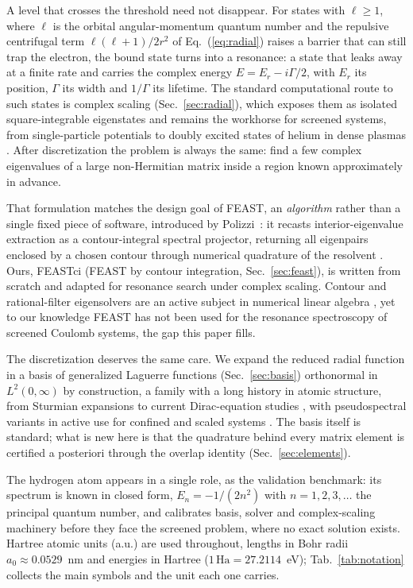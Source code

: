 \documentclass[12pt,twoside]{paper}
\newcommand{\Ha}{\,\mathrm{Ha}}
\begin{document}
A level that crosses the threshold need not disappear. For states with
$\ell \ge 1$, where $\ell$ is the orbital angular-momentum quantum number
and the repulsive centrifugal term $\ell(\ell+1)/2r^2$ of
Eq.~(\ref{eq:radial}) raises a barrier that can still trap the electron,
the bound state turns into a resonance: a state that leaks away at a
finite rate and carries the complex energy $E = E_r - i\Gamma/2$, with
$E_r$ its position, $\Gamma$ its width and $1/\Gamma$ its lifetime. The
standard computational route to such states is complex scaling
(Sec.~\ref{sec:radial}), which exposes them as isolated square-integrable
eigenstates \cite{Moiseyev2011} and remains the workhorse for screened
systems, from single-particle potentials \cite{Jiao2021} to doubly
excited states of helium in dense plasmas \cite{Dong2024}. After
discretization the problem is always the same: find a few complex
eigenvalues of a large non-Hermitian matrix inside a region known
approximately in advance.

That formulation matches the design goal of FEAST, an \emph{algorithm}
rather than a single fixed piece of software, introduced by
Polizzi~\cite{Polizzi2009}: it recasts interior-eigenvalue extraction as a
contour-integral spectral projector, returning all eigenpairs enclosed by
a chosen contour through numerical quadrature of the resolvent
\cite{Polizzi2009,Kestyn2016}. Ours, FEASTci (FEAST by contour
integration, Sec.~\ref{sec:feast}), is written from scratch and adapted
for resonance search under complex scaling. Contour and rational-filter
eigensolvers are an active subject in numerical linear algebra
\cite{Brennan2023}, yet to our knowledge FEAST has not been used for the
resonance spectroscopy of screened Coulomb systems, the gap this paper
fills.

The discretization deserves the same care. We expand the reduced radial
function in a basis of generalized Laguerre functions
(Sec.~\ref{sec:basis}) orthonormal in $L^2(0,\infty)$ by construction, a
family with a long history in atomic structure, from Sturmian expansions
\cite{Rotenberg1970} to current Dirac-equation studies \cite{Wu2025},
with pseudospectral variants in active use for confined and scaled
systems \cite{Zhu2020}. The basis itself is standard; what
is new here is that the quadrature behind every matrix element is
certified a posteriori through the overlap identity
(Sec.~\ref{sec:elements}).

The hydrogen atom appears in a single role, as the validation benchmark:
its spectrum is known in closed form, $E_n = -1/(2n^2)$ with
$n = 1, 2, 3, \dots$ the principal quantum number, and calibrates basis,
solver and complex-scaling machinery before they face the screened
problem, where no exact solution exists. Hartree atomic units (a.u.) are
used throughout, lengths in Bohr radii $a_0 \approx 0.0529$~nm and
energies in Hartree ($1\Ha = 27.2114$~eV); Tab.~\ref{tab:notation}
collects the main symbols and the unit each one carries.
\end{document}
